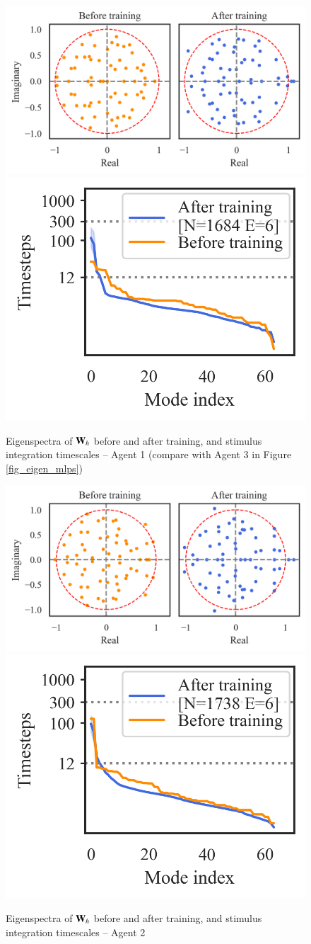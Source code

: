 \documentclass[5p,twocolumn,authoryear]{elsarticle}
\begin{document}
\begin{figure}[h!]
\centering
\includegraphics[width=0.45\linewidth]{eigenspectra_2760377.png}
\includegraphics[width=0.27\linewidth]{timescales_2760377.png}
\caption[Eigenspectra of $\bW_h$ before and after training, and stimulus integration timescales -- Agent 1]{Eigenspectra of $\bW_h$ before and after training, and stimulus integration timescales -- Agent 1 (compare with Agent 3 in Figure \ref{fig_eigen_mlps})}
\end{figure}

\begin{figure}[h!]
\centering
\includegraphics[width=0.45\linewidth]{eigenspectra_3199993.png}
\includegraphics[width=0.27\linewidth]{timescales_3199993.png}
\caption{Eigenspectra of $\bW_h$ before and after training, and stimulus integration timescales -- Agent 2}
\end{figure}
\end{document}
